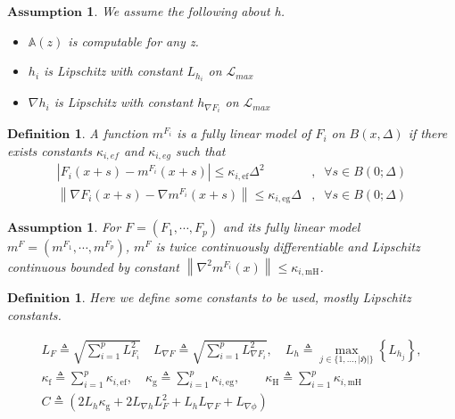 \documentclass[10pt, oneside]{article}
\newtheorem{defn}[thm]{$\mathbf{Definition}$}
\newtheorem{asp}[thm]{$\mathbf{Assumption}$}
\begin{document}
\begin{asp}
We assume the following about h.
\begin{itemize}
\item $\mathbb{A}(z)$ is computable for any z. 
\item $h_i$ is Lipschitz with constant $L_{h_i}$ on $\mathcal{L}_{max}$
\item $\nabla h_i$ is Lipschitz with constant $h_{\nabla F_i}$ on $\mathcal{L}_{max}$
\end{itemize}
\end{asp}

\begin{defn}
A function $m^{F_i}$ is a fully linear model of $F_i$ on $B(x,\Delta)$ if there exists constants $\kappa_{i,ef}$ and $\kappa_{i,eg}$ such that
$$
\begin{aligned}
\left|F_{i}(x+s)-m^{F_{i}}(x+s)\right| \leq \kappa_{i, \mathrm{ef}} \Delta^{2} &,\;\; \forall s \in B(0 ; \Delta) \\
\left\|\nabla F_{i}(x+s)-\nabla m^{F_{i}}(x+s)\right\| \leq \kappa_{i, \mathrm{eg}} \Delta &,\;\; \forall s \in B (0 ; \Delta)
\end{aligned}
$$
\end{defn}

\begin{asp}
\label{secondlip}
For $F=(F_1,\cdots,F_p)$ and its fully linear model $m^F=(m^{F_1},\cdots, m^{F_p})$, $m^F$ is twice continuously differentiable and Lipschitz continuous bounded by constant $\left\|\nabla^{2} m^{F_{i}}(x)\right\| \leq \kappa_{i, \mathrm{mH}}$.
\end{asp}


\begin{defn}
\label{constants}
Here we define some constants to be used, mostly Lipschitz constants.

$$
\begin{array}{c}
L_{F} \triangleq \sqrt{\sum_{i=1}^{p} L_{F_{i}}^{2}} \quad L_{\nabla F} \triangleq \sqrt{\sum_{i=1}^{p} L_{\nabla F_{i}}^{2}}, \quad L_{h} \triangleq \max _{j \in\{1, \ldots,|\mathfrak{H}|\}}\left\{L_{h_{j}}\right\}, \\
\kappa_{\mathrm{f}} \triangleq \sum_{i=1}^{p} \kappa_{i, \mathrm{ef}}, \quad \kappa_{\mathrm{g}} \triangleq \sum_{i=1}^{p} \kappa_{i, \mathrm{eg}}, \quad \quad \kappa_{\mathrm{H}} \triangleq \sum_{i=1}^{p} \kappa_{i, \mathrm{mH}} \\
C \triangleq\left(2 L_{h} \kappa_{\mathrm{g}}+2 L_{\nabla h} L_{F}^{2}+L_{h} L_{\nabla F}+L_{\nabla \phi}\right)
\end{array}
$$
\end{defn}
\end{document}
